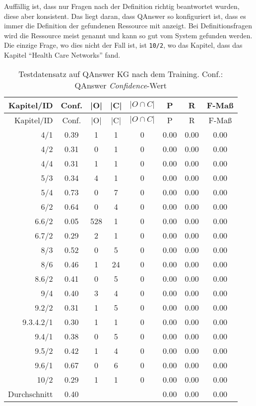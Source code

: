 Auffällig ist, dass nur Fragen nach der Definition richtig beantwortet wurden, diese aber konsistent.
Das liegt daran, dass QAnswer so konfiguriert ist, dass es immer die Definition der gefundenen Ressource mit anzeigt.
Bei Definitionsfragen wird die Ressource meist genannt und kann so gut vom System gefunden werden.
Die einzige Frage, wo dies nicht der Fall ist, ist \texttt{10/2}, wo das Kapitel, dass das Kapitel \enquote{Health Care Networks} fand.

\begin{longtable}{r c c c c c c c}
  \caption[Testdatensatz QAnswer nach Training]{Testdatensatz auf QAnswer KG nach dem Training.
  Conf.: QAnswer \emph{Confidence}-Wert}
  \label{tab:qanswervortraining}
  \\
  \toprule
  Kapitel/ID    & Conf. & |O|   & |C|   & $|O \cap C|$  & P     & R     & F-Maß   \\
  \midrule
  \endfirsthead
  \toprule
  Kapitel/ID    & Conf. & |O|   & |C|   & $|O \cap C|$  & P     & R     & F-Maß   \\
  \midrule
  \endhead
	4/1			& 0.39 & 1 & 1 & 0 & 0.00 & 0.00 & 0.00 \\
	4/2			& 0.31 & 0 & 1 & 0 & 0.00 & 0.00 & 0.00 \\
	4/4			& 0.31 & 1 & 1 & 0 & 0.00 & 0.00 & 0.00 \\
	5/3			& 0.34 & 4 & 1 & 0 & 0.00 & 0.00 & 0.00 \\
	5/4			& 0.73 & 0 & 7 & 0 & 0.00 & 0.00 & 0.00 \\
	6/2			& 0.64 & 0 & 4 & 0 & 0.00 & 0.00 & 0.00 \\
	6.6/2		& 0.05 & 528 & 1 & 0 & 0.00 & 0.00 & 0.00 \\
	6.7/2		& 0.29 & 2 & 1 & 0 & 0.00 & 0.00 & 0.00 \\
	8/3			& 0.52 & 0 & 5 & 0 & 0.00 & 0.00 & 0.00 \\
	8/6			& 0.46 & 1 & 24 & 0 & 0.00 & 0.00 & 0.00 \\
	8.6/2		& 0.41 & 0 & 5 & 0 & 0.00 & 0.00 & 0.00 \\
	9/4			& 0.40 & 3 & 4 & 0 & 0.00 & 0.00 & 0.00 \\
	9.2/2		& 0.31 & 1 & 5 & 0 & 0.00 & 0.00 & 0.00 \\
	9.3.4.2/1	& 0.30 & 1 & 1 & 0 & 0.00 & 0.00 & 0.00 \\
	9.4/1		& 0.38 & 0 & 5 & 0 & 0.00 & 0.00 & 0.00 \\
	9.5/2		& 0.42 & 1 & 4 & 0 & 0.00 & 0.00 & 0.00 \\
	9.6/1		& 0.67 & 0 & 6 & 0 & 0.00 & 0.00 & 0.00 \\
	10/2		& 0.29 & 1 & 1 & 0 & 0.00 & 0.00 & 0.00 \\
  \midrule
  Durchschnitt  & 0.40 &  &  &   & 0.00 & 0.00 & 0.00 \\
  \bottomrule
\end{longtable}

